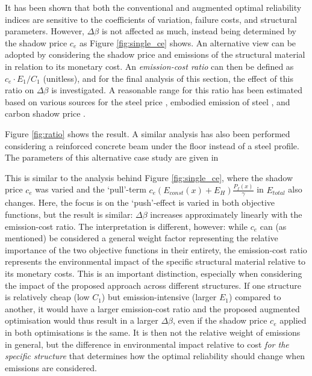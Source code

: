It has been shown that both the conventional and augmented optimal reliability indices are sensitive to the coefficients of variation, failure costs, and structural parameters.
However, $\Delta \beta$ is not affected as much, instead being determined by the shadow price $c_e$ as Figure \ref{fig:single_ce} shows.
An alternative view can be adopted by considering the shadow price and emissions of the structural material in relation to its monetary cost.
An \emph{emission-cost ratio} can then be defined as $c_e \cdot E_1 / C_1$ (unitless), and for the final analysis of this section, the effect of this ratio on $\Delta \beta$ is investigated.
A reasonable range for this ratio has been estimated based on various sources for the steel price \citep{bauforumstahle.V.2026BaukostenBauforumstahl, Bouwenmetstaal2024CostComponents, BritishConstructionalSteelworkAssociationCostSteelConstruction.info}, embodied emission of steel \citep{TATASteel2017BenefitsOwnership, WorldSteelAssociation2021ClimateSteel, OveArupPartners2023BuildingsSteel}, and carbon shadow price \citep{WorldBank2025PriceDashboard, EuropeanInvestmentBank2025ShadowPricing, Wang2017TheIndustry}.

Figure \ref{fig:ratio} shows the result.
A similar analysis has also been performed considering a reinforced concrete beam under the floor instead of a steel profile.
The parameters of this alternative case study are given in 

This is similar to the analysis behind Figure \ref{fig:single_ce}, where the shadow price $c_e$ was varied and the `pull'-term $c_e (E_{const}(x) + E_H) \frac{P_f(x)}{\gamma}$ in $E_{total}$ also changes.
Here, the focus is on the `push'-effect is varied in both objective functions, but the result is similar: $\Delta \beta$ increases approximately linearly with the emission-cost ratio.
The interpretation is different, however: while $c_e$ can (as mentioned) be considered a general weight factor representing the relative importance of the two objective functions in their entirety, the emission-cost ratio represents the environmental impact of the specific structural material relative to its monetary costs.
This is an important distinction, especially when considering the impact of the proposed approach across different structures.
If one structure is relatively cheap (low $C_1$) but emission-intensive (larger $E_1$) compared to another, it would have a larger emission-cost ratio and the proposed augmented optimisation would thus result in a larger $\Delta \beta$, even if the shadow price $c_e$ applied in both optimisations is the same.
It is then not the relative weight of emissions in general, but the difference in environmental impact relative to cost \emph{for the specific structure} that determines how the optimal reliability should change when emissions are considered.

